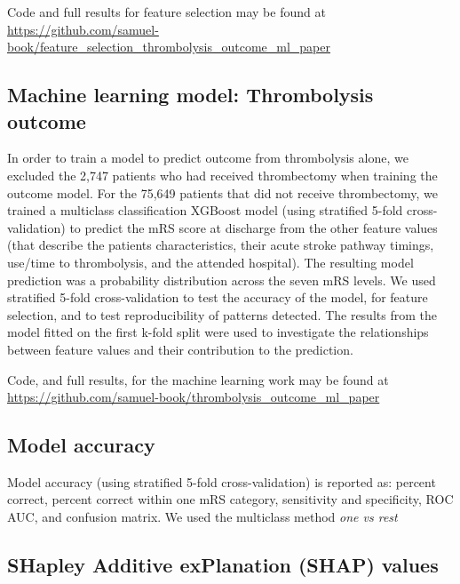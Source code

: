 Code and full results for feature selection may be found at \url{https://github.com/samuel-book/feature_selection_thrombolysis_outcome_ml_paper}

\subsection{Machine learning model: Thrombolysis outcome}

In order to train a model to predict outcome from thrombolysis alone, we excluded the 2,747 patients who had received thrombectomy when training the outcome model. For the 75,649 patients that did not receive thrombectomy, we trained a multiclass classification XGBoost model (using stratified 5-fold cross-validation) to predict the mRS score at discharge from the other feature values (that describe the patients characteristics, their acute stroke pathway timings, use/time to thrombolysis, and the attended hospital). The resulting model prediction was a probability distribution across the seven mRS levels. We used stratified 5-fold cross-validation to test the accuracy of the model, for feature selection, and to test reproducibility of patterns detected. The results from the model fitted on the first k-fold split were used to investigate the relationships between feature values and their contribution to the prediction.

Code, and full results, for the machine learning work may be found at \url{https://github.com/samuel-book/thrombolysis_outcome_ml_paper}

\subsection{Model accuracy}

Model accuracy (using stratified 5-fold cross-validation) is reported as: percent correct, percent correct within one mRS category, sensitivity and specificity, ROC AUC, and confusion matrix. We used the multiclass method \textit{one vs rest} %

\subsection{SHapley Additive exPlanation (SHAP) values}

